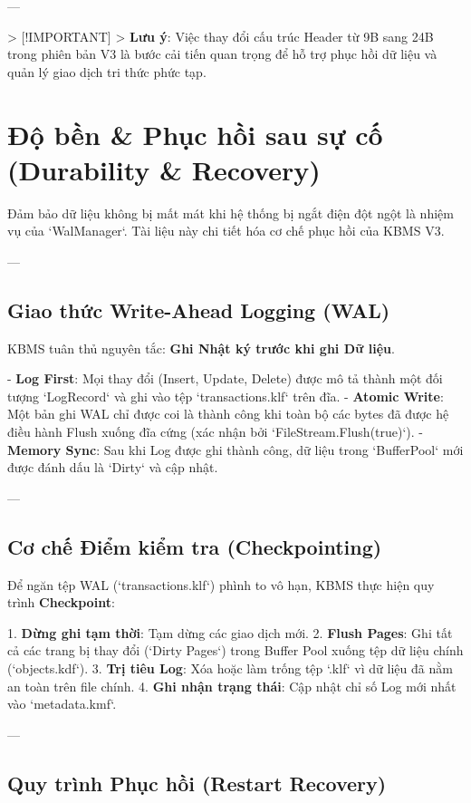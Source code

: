 ---

> [!IMPORTANT]
> \textbf{Lưu ý}: Việc thay đổi cấu trúc Header từ 9B sang 24B trong phiên bản V3 là bước cải tiến quan trọng để hỗ trợ phục hồi dữ liệu và quản lý giao dịch tri thức phức tạp.

\section{Độ bền & Phục hồi sau sự cố (Durability & Recovery)}

Đảm bảo dữ liệu không bị mất mát khi hệ thống bị ngắt điện đột ngột là nhiệm vụ của `WalManager`. Tài liệu này chi tiết hóa cơ chế phục hồi của KBMS V3.

---

\subsection{Giao thức Write-Ahead Logging (WAL)}

KBMS tuân thủ nguyên tắc: \textbf{Ghi Nhật ký trước khi ghi Dữ liệu}.

-   \textbf{Log First}: Mọi thay đổi (Insert, Update, Delete) được mô tả thành một đối tượng `LogRecord` và ghi vào tệp `transactions.klf` trên đĩa.
-   \textbf{Atomic Write}: Một bản ghi WAL chỉ được coi là thành công khi toàn bộ các bytes đã được hệ điều hành Flush xuống đĩa cứng (xác nhận bởi `FileStream.Flush(true)`).
-   \textbf{Memory Sync}: Sau khi Log được ghi thành công, dữ liệu trong `BufferPool` mới được đánh dấu là `Dirty` và cập nhật.

---

\subsection{Cơ chế Điểm kiểm tra (Checkpointing)}

Để ngăn tệp WAL (`transactions.klf`) phình to vô hạn, KBMS thực hiện quy trình \textbf{Checkpoint}:

1.  \textbf{Dừng ghi tạm thời}: Tạm dừng các giao dịch mới.
2.  \textbf{Flush Pages}: Ghi tất cả các trang bị thay đổi (`Dirty Pages`) trong Buffer Pool xuống tệp dữ liệu chính (`objects.kdf`).
3.  \textbf{Trị tiêu Log}: Xóa hoặc làm trống tệp `.klf` vì dữ liệu đã nằm an toàn trên file chính.
4.  \textbf{Ghi nhận trạng thái}: Cập nhật chỉ số Log mới nhất vào `metadata.kmf`.

---

\subsection{Quy trình Phục hồi (Restart Recovery)}


